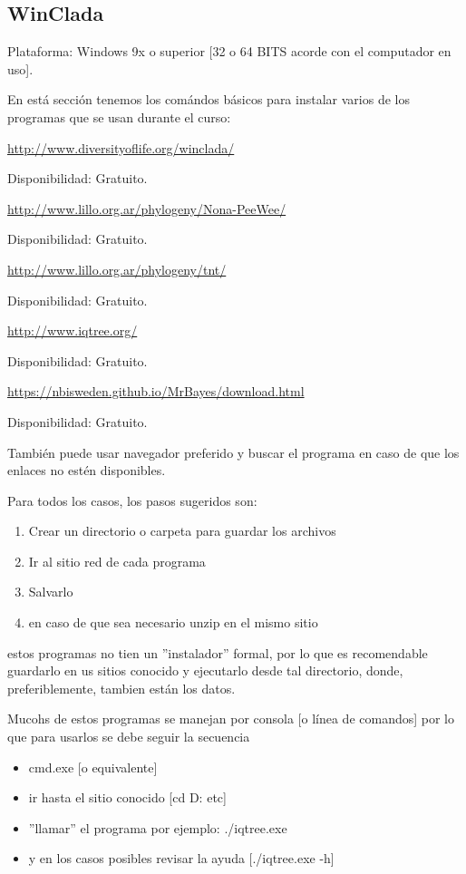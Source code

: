 \subsection{WinClada}
\noindent


Plataforma: Windows 9x o superior [32 o 64 BITS acorde con el computador en uso].

En est\'a secci\'on tenemos los com\'andos b\'asicos para instalar varios de los programas que se usan durante el curso:


\url{http://www.diversityoflife.org/winclada/}

 Disponibilidad: Gratuito. 

 
 

\url{http://www.lillo.org.ar/phylogeny/Nona-PeeWee/}

 Disponibilidad: Gratuito. 

 

\url{http://www.lillo.org.ar/phylogeny/tnt/}

Disponibilidad: Gratuito. 

 
\url{http://www.iqtree.org/}

Disponibilidad: Gratuito. 

 
\url{https://nbisweden.github.io/MrBayes/download.html}

Disponibilidad: Gratuito. 
 

Tambi\'en puede usar navegador preferido y  buscar el programa en caso de que los enlaces no estén disponibles.


Para todos los casos, los pasos sugeridos son:

 

\begin{enumerate}
\item Crear un directorio o carpeta para  guardar los archivos 
\item Ir al sitio red de cada programa
\item Salvarlo
\item en caso de que sea necesario unzip en el mismo sitio
\end{enumerate}

estos programas no tien un ''instalador'' formal, por lo que es recomendable guardarlo en us sitios conocido y ejecutarlo desde tal directorio, donde, preferiblemente, tambien están los datos.



Mucohs de estos programas se manejan por consola [o l\'inea de comandos] por lo que para usarlos se debe seguir la secuencia

\begin{itemize}
\item cmd.exe [o equivalente]
\item ir hasta el sitio conocido [cd D: etc]
\item ''llamar'' el programa por ejemplo: ./iqtree.exe
\item y en los casos posibles revisar la ayuda  [./iqtree.exe -h]
\end{itemize}
